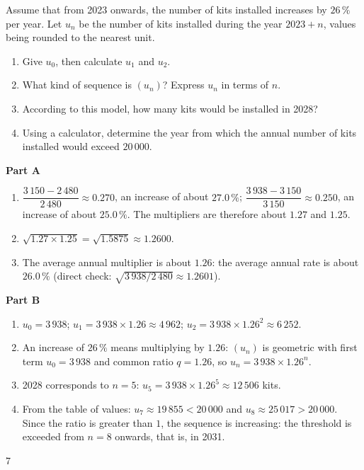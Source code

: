 {Assume that from 2023 onwards, the number of kits installed increases by $26\,\%$ per year. Let $u_n$ be the number of kits installed during the year $2023+n$, values being rounded to the nearest unit.
\begin{enumerate}
\item Give $u_0$, then calculate $u_1$ and $u_2$.
\item What kind of sequence is $(u_n)$? Express $u_n$ in terms of $n$.
\item According to this model, how many kits would be installed in 2028?
\item Using a calculator, determine the year from which the annual number of kits installed would exceed $20\,000$.
\end{enumerate}
}{%
\textbf{Part A}
\begin{enumerate}
\item $\dfrac{3\,150-2\,480}{2\,480}\approx0.270$, an increase of about $27.0\,\%$; $\dfrac{3\,938-3\,150}{3\,150}\approx0.250$, an increase of about $25.0\,\%$. The multipliers are therefore about $1.27$ and $1.25$.
\item $\sqrt{1.27\times1.25}=\sqrt{1.5875}\approx1.2600$.
\item The average annual multiplier is about $1.26$: the average annual rate is about $26.0\,\%$ (direct check: $\sqrt{3\,938/2\,480}\approx1.2601$).
\end{enumerate}
\textbf{Part B}
\begin{enumerate}
\item $u_0=3\,938$; $u_1=3\,938\times1.26\approx4\,962$; $u_2=3\,938\times1.26^2\approx6\,252$.
\item An increase of $26\,\%$ means multiplying by $1.26$: $(u_n)$ is geometric with first term $u_0=3\,938$ and common ratio $q=1.26$, so $u_n=3\,938\times1.26^n$.
\item 2028 corresponds to $n=5$: $u_5=3\,938\times1.26^5\approx12\,506$ kits.
\item From the table of values: $u_7\approx19\,855<20\,000$ and $u_8\approx25\,017>20\,000$. Since the ratio is greater than $1$, the sequence is increasing: the threshold is exceeded from $n=8$ onwards, that is, in 2031.
\end{enumerate}
}{7}

